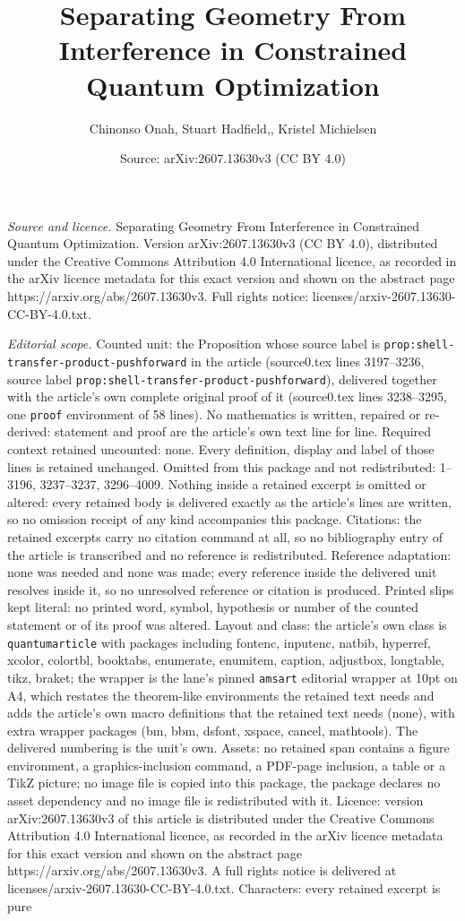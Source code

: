 \documentclass[10pt,a4paper]{amsart}
\title[Separating Geometry From Interference in Constrained Quantum]{Separating Geometry From Interference in Constrained Quantum Optimization}
\author{Chinonso Onah, Stuart Hadfield,, Kristel Michielsen}
\date{Source: arXiv:2607.13630v3 (CC BY 4.0)}
\begin{document}
\maketitle

\noindent\emph{Source and licence.} Separating Geometry From Interference in Constrained Quantum Optimization. Version arXiv:2607.13630v3 (CC BY 4.0), distributed under the Creative Commons Attribution 4.0 International licence, as recorded in the arXiv licence metadata for this exact version and shown on the abstract page https://arxiv.org/abs/2607.13630v3. Full rights notice: licenses/arxiv-2607.13630-CC-BY-4.0.txt.\par\smallskip

\noindent\textit{Editorial scope.} Counted unit: the Proposition whose source label is \texttt{prop:shell-transfer-product-pushforward} in the article (source0.tex lines 3197--3236, source label \texttt{prop:shell-transfer-product-pushforward}), delivered together with the article's own complete original proof of it (source0.tex lines 3238--3295, one \texttt{proof} environment of 58 lines). No mathematics is written, repaired or re-derived: statement and proof are the article's own text line for line. Required context retained uncounted: none. Every definition, display and label of those lines is retained unchanged. Omitted from this package and not redistributed: 1--3196, 3237--3237, 3296--4009. Nothing inside a retained excerpt is omitted or altered: every retained body is delivered exactly as the article's lines are written, so no omission receipt of any kind accompanies this package. Citations: the retained excerpts carry no citation command at all, so no bibliography entry of the article is transcribed and no reference is redistributed. Reference adaptation: none was needed and none was made; every reference inside the delivered unit resolves inside it, so no unresolved reference or citation is produced. Printed slips kept literal: no printed word, symbol, hypothesis or number of the counted statement or of its proof was altered. Layout and class: the article's own class is \texttt{quantumarticle} with packages including fontenc, inputenc, natbib, hyperref, xcolor, colortbl, booktabs, enumerate, enumitem, caption, adjustbox, longtable, tikz, braket; the wrapper is the lane's pinned \texttt{amsart} editorial wrapper at 10pt on A4, which restates the theorem-like environments the retained text needs and adds the article's own macro definitions that the retained text needs (none), with extra wrapper packages (bm, bbm, dsfont, xspace, cancel, mathtools). The delivered numbering is the unit's own. Assets: no retained span contains a figure environment, a graphics-inclusion command, a PDF-page inclusion, a table or a TikZ picture; no image file is copied into this package, the package declares no asset dependency and no image file is redistributed with it. Licence: version arXiv:2607.13630v3 of this article is distributed under the Creative Commons Attribution 4.0 International licence, as recorded in the arXiv licence metadata for this exact version and shown on the abstract page https://arxiv.org/abs/2607.13630v3. A full rights notice is delivered at licenses/arxiv-2607.13630-CC-BY-4.0.txt. Characters: every retained excerpt is pure 
\end{document}
